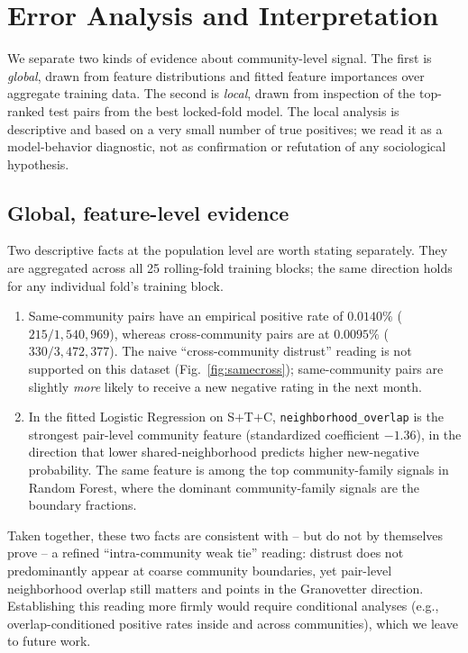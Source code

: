 \documentclass[conference]{IEEEtran}
\newcommand{\code}[1]{\texttt{#1}}
\begin{document}
\section{Error Analysis and Interpretation}

We separate two kinds of evidence about community-level signal. The
first is \emph{global}, drawn from feature distributions and fitted
feature importances over aggregate training data. The second is
\emph{local}, drawn from inspection of the top-ranked test pairs from
the best locked-fold model. The local analysis is descriptive and
based on a very small number of true positives; we read it as a
model-behavior diagnostic, not as confirmation or refutation of any
sociological hypothesis.

\subsection{Global, feature-level evidence}

Two descriptive facts at the population level are worth stating
separately. They are aggregated across all 25 rolling-fold training
blocks; the same direction holds for any individual fold's training
block.

\begin{enumerate}
\item Same-community pairs have an empirical positive rate of
$0.0140\%$ ($215 / 1{,}540{,}969$), whereas cross-community pairs are
at $0.0095\%$ ($330 / 3{,}472{,}377$). The naive ``cross-community
distrust'' reading is not supported on this dataset
(Fig.~\ref{fig:samecross}); same-community pairs are slightly
\emph{more} likely to receive a new negative rating in the next month.
\item In the fitted Logistic Regression on S$+$T$+$C,
\code{neighborhood\_overlap} is the strongest pair-level community
feature (standardized coefficient $-1.36$), in the direction that
lower shared-neighborhood predicts higher new-negative probability.
The same feature is among the top community-family signals in Random
Forest, where the dominant community-family signals are the boundary
fractions.
\end{enumerate}

Taken together, these two facts are consistent with -- but do not by
themselves prove -- a refined ``intra-community weak tie'' reading:
distrust does not predominantly appear at coarse community boundaries,
yet pair-level neighborhood overlap still matters and points in the
Granovetter direction. Establishing this reading more firmly would
require conditional analyses (e.g., overlap-conditioned positive rates
inside and across communities), which we leave to future work.
\end{document}
